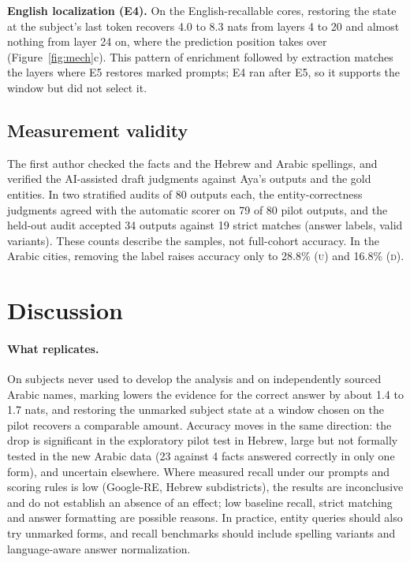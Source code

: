 \documentclass[11pt]{article}
\newcommand{\U}{\textsc{u}}
\newcommand{\D}{\textsc{d}}
\begin{document}
\textbf{English localization (E4).} On the English-recallable cores, restoring the state at the subject's last token recovers 4.0 to 8.3 nats from layers 4 to 20
and almost nothing from layer 24 on, where
the prediction position takes over (Figure~\ref{fig:mech}c). This pattern of enrichment followed by extraction \citep{meng-etal-2022-locating,geva-etal-2023-dissecting} matches the layers where E5 restores marked prompts; E4 ran after E5, so
it supports the window but did not select it.

\subsection{Measurement validity}
\label{sec:validity}
The first author checked the facts and the Hebrew and Arabic spellings, and
verified the AI-assisted draft judgments against Aya's outputs and the gold
entities. In two stratified audits of 80 outputs each, the entity-correctness
judgments agreed with the automatic scorer on 79 of 80 pilot outputs, and the
held-out audit accepted 34 outputs against 19 strict matches (answer labels,
valid variants). These counts describe the samples, not full-cohort accuracy. In the Arabic cities, removing the label raises accuracy only to 28.8\% (\U) and 16.8\% (\D).

\section{Discussion}
\label{sec:discussion}

\paragraph{What replicates.} On subjects never used to develop the analysis and
on independently sourced Arabic names, marking lowers the evidence for the
correct answer by about 1.4 to 1.7 nats, and restoring the unmarked subject
state at a window chosen on the pilot recovers a comparable amount. Accuracy
moves in the same direction: the drop is significant in the exploratory pilot
test in Hebrew, large but not formally tested in the new Arabic data (23 against
4 facts answered correctly in only one form), and uncertain elsewhere. Where
measured recall
under our prompts and scoring rules is low (Google-RE, Hebrew subdistricts), the
results are inconclusive and do not establish an absence of an effect; low
baseline recall, strict matching and answer formatting are possible reasons. In
practice, entity queries should also try unmarked forms, and recall benchmarks
should include spelling variants and language-aware answer normalization.
\end{document}
